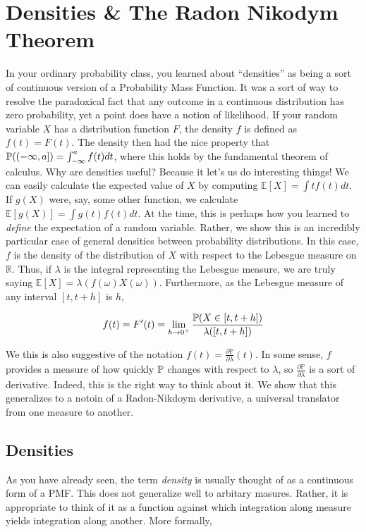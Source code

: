 \chapter{Densities \& The Radon Nikodym Theorem}

In your ordinary probability class, you learned about 
``densities'' as being a sort of continuous version of a Probability 
Mass Function. It was a sort of way to resolve the paradoxical fact that 
any outcome in a continuous distribution has zero probability, yet a point 
does have a notion of likelihood. If your random variable $X$ has a distribution 
function $F$, the density $f$ is defined as $f(t) = F(t)$. The density then had 
the nice property that $\mathbb P((-\infty, a]) = \int_{-\infty}^a f(t)dt$, where this holds by 
the fundamental theorem of calculus. Why are densities useful? Because it let's us do 
interesting things! We can easily calculate the expected value of $X$ by computing 
$\mathbb E[X] = \int tf(t)dt$. If $g(X)$ were, say, some other function, we calculate 
$\mathbb E[g(X)] = \int g(t)f(t)dt$. At the time, this is perhaps how you learned 
to \emph{define} the expectation of a random variable. Rather, we show this is an 
incredibly particular case of general densities between probability distributions. In this case, 
$f$ is the density of the distribution of $X$ with respect to the Lebesgue measure on 
$\mathbb R$. Thus, if $\lambda$ is the integral representing the Lebesgue measure, we are truly 
saying $\mathbb E[X] = \lambda(f(\omega)X(\omega))$. Furthermore, as the Lebesgue measure of 
any interval $[t,t+h]$ is $h$,

\[ f(t) = F'(t) = \lim_{h \to 0^+} \frac{\mathbb P(X \in [t, t+h])}{\lambda([t,t+h])}  \]

We this is also suggestive of the notation $f(t) = \frac{\partial \mathbb P}{\partial \lambda}(t)$. In some sense, 
$f$ provides a measure of how quickly $\mathbb P$ changes with respect to $\lambda$, so $\frac{\partial \mathbb P}{\partial \lambda}$ is 
a sort of derivative. Indeed, this is the right way to think about it. We show that this generalizes to a notoin of a 
Radon-Nikdoym derivative, a universal translator from one measure to another. 

\section{Densities}

As you have already seen, the term \emph{density} is usually thought of as a continuous form of a 
PMF. This does not generalize well to arbitary masures. Rather, it is appropriate to think of it as a 
function against which integration along measure yields integration along another. More formally, 

